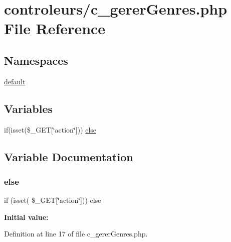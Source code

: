 \hypertarget{c__gerer_genres_8php}{}\section{controleurs/c\+\_\+gerer\+Genres.php File Reference}
\label{c__gerer_genres_8php}
\subsection*{Namespaces}
\begin{DoxyCompactItemize}
\item 
 \hyperlink{namespacedefault}{default}
\end{DoxyCompactItemize}
\subsection*{Variables}
\begin{DoxyCompactItemize}
\item 
if(isset(\$\+\_\+\+G\+ET\mbox{[}\char`\"{}action\char`\"{}\mbox{]})) \hyperlink{c__gerer_genres_8php_aa4db7f7a27517cf5cd3ff1f2577caa64}{else}
\end{DoxyCompactItemize}


\subsection{Variable Documentation}
\mbox{\label{c__gerer_genres_8php_aa4db7f7a27517cf5cd3ff1f2577caa64}} 
\subsubsection{\texorpdfstring{else}{else}}
{\footnotesize\ttfamily if (isset( \$\+\_\+\+G\+ET\mbox{[}\char`\"{}action\char`\"{}\mbox{]})) else}

{\bfseries Initial value\+:}


Definition at line 17 of file c\+\_\+gerer\+Genres.\+php.

